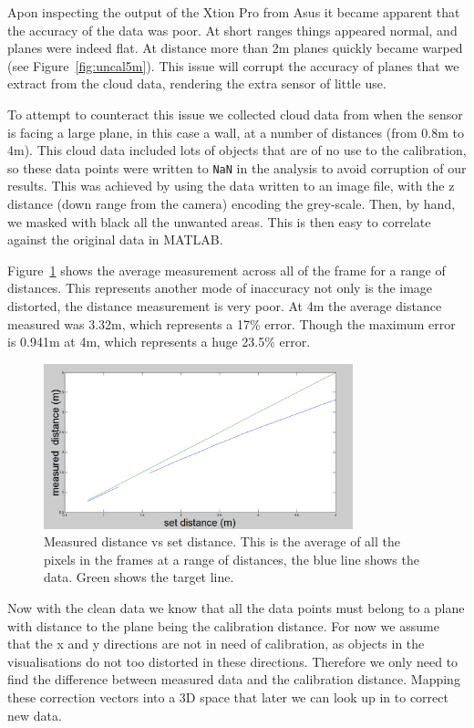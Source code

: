 \documentclass[]{article}
\begin{document}
{Apon inspecting the output of the Xtion Pro from Asus it became apparent that the accuracy of the data was poor. At short ranges things appeared normal, and planes were indeed flat. At distance more than 2m planes quickly became warped (see Figure~\ref{fig:uncal5m}). This issue will corrupt the accuracy of planes that we extract from the cloud data, rendering the extra sensor of little use. 

To attempt to counteract this issue we collected cloud data from when the sensor is facing a large plane, in this case a wall, at a number of distances (from 0.8m to 4m). This cloud data included lots of objects that are of no use to the calibration, so these data points were written to \verb"NaN" in the analysis to avoid corruption of our results. This was achieved by using the data written to an image file, with the z distance (down range from the camera) encoding the grey-scale. Then, by hand, we masked with black all the unwanted areas. This is then easy to correlate against the original data in MATLAB. 

Figure~\ref{fig:avDist} shows the average measurement across all of the frame for a range of distances. This represents another mode of inaccuracy not only is the image distorted, the distance measurement is very poor. At 4m the average distance measured was 3.32m, which represents a 17\% error. Though the maximum error is 0.941m at 4m, which represents a huge 23.5\% error. 

\begin{figure}[htb]
	\begin{center}
		\includegraphics[width = 0.8\textwidth]{avDist}
	\end{center}
	\caption{Measured distance vs set distance. This is the average of all the pixels in the frames at a range of distances, the blue line shows the data. Green shows the target line.}
	\label{fig:avDist}
\end{figure}

Now with the clean data we know that all the data points must belong to a plane with distance to the plane being the calibration distance. For now we assume that the x and y directions are not in need of calibration, as objects in the visualisations do not too distorted in these directions. Therefore we only need to find the difference between measured data and the calibration distance. Mapping these correction vectors into a 3D space that later we can look up in to correct new data. 

}
\end{document}
